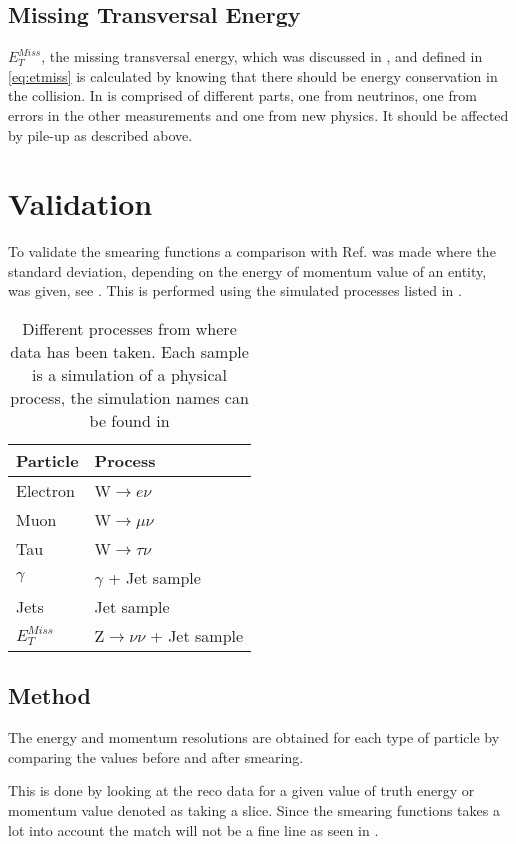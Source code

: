 \subsection{Missing Transversal Energy}
$E_T^{Miss}$, the missing transversal energy, which was discussed in , and defined in \eqref{eq:etmiss} is calculated by knowing that there should be energy conservation in the collision. In is comprised of different parts, one from neutrinos, one from errors in the other measurements and one from new physics. It should be affected by pile-up as described above.

\newpage
\section{Validation}\label{sec:vali}
To validate the smearing functions a comparison with Ref. \citep{ATL-PHYS-PUB-2013-004} was made where the standard deviation, depending on the energy of momentum value of an entity, was given, see . This is performed using the simulated processes listed in . 
\begin{SCtable}[][ht]
\begin{tabular}{|l|l|}
\hline
Particle & Process \\ \hline
Electron & W$\rightarrow e\nu$ \\
Muon & W$\rightarrow \mu \nu$ \\
Tau & W$\rightarrow \tau \nu$ \\
$\gamma$ & $\gamma$ + Jet sample \\
Jets & Jet sample \\
$E_T^{Miss}$ & Z$\rightarrow \nu \nu$ + Jet sample \\ \hline
\end{tabular}
\caption{Different processes from where data has been taken. Each sample is a simulation of a physical process, the simulation names can be found in }
\label{tab:backproc}
\end{SCtable}

\subsection{Method}
The energy and momentum resolutions are obtained for each type of particle by comparing the values before and after smearing.

This is done by looking at the reco data for a given value of truth energy or momentum value denoted as taking a slice. 
Since the smearing functions takes a lot into account the match will not be a fine line as seen in .

